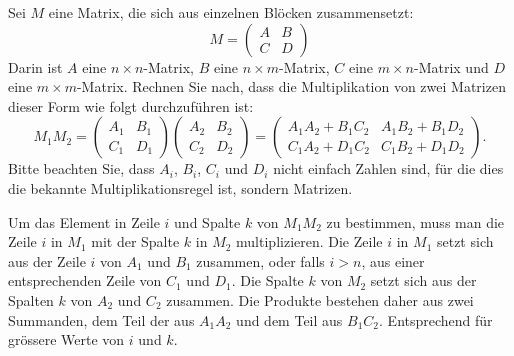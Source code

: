 Sei $M$ eine Matrix, die sich aus einzelnen Blöcken zusammensetzt:
\[
M
=
\begin{pmatrix}
A&B\\
C&D
\end{pmatrix}
\]
Darin ist $A$ eine $n\times n$-Matrix, $B$ eine $n\times m$-Matrix,
$C$ eine $m\times n$-Matrix und $D$ eine $m\times m$-Matrix. Rechnen
Sie nach, dass die Multiplikation von zwei Matrizen dieser Form
wie folgt durchzuführen ist:
\[
M_1M_2=
\begin{pmatrix}
A_1&B_1\\
C_1&D_1
\end{pmatrix}
\begin{pmatrix}
A_2&B_2\\
C_2&D_2
\end{pmatrix}
=\begin{pmatrix}
A_1A_2+B_1C_2&A_1B_2+B_1D_2\\
C_1A_2+D_1C_2&C_1B_2+D_1D_2
\end{pmatrix}.
\]
Bitte beachten Sie, dass $A_i$, $B_i$, $C_i$ und $D_i$  nicht einfach
Zahlen sind, für die dies die bekannte Multiplikationsregel ist,
sondern Matrizen.


\begin{loesung}
Um das Element in Zeile $i$ und Spalte $k$ von $M_1M_2$ zu bestimmen,
muss man die Zeile $i$ in $M_1$ mit der Spalte $k$ in $M_2$ multiplizieren.
Die Zeile $i$ in $M_1$ setzt sich aus der Zeile $i$ von $A_1$ und $B_1$
zusammen, oder falls $i > n$, aus einer entsprechenden Zeile von
$C_1$ und $D_1$.
Die Spalte $k$ von $M_2$ setzt sich aus der Spalten $k$ von
$A_2$ und $C_2$ zusammen.
Die Produkte bestehen daher aus zwei Summanden, dem Teil
der aus $A_1A_2$
und dem Teil aus $B_1C_2$. Entsprechend für grössere Werte von $i$
und $k$.
\end{loesung}

